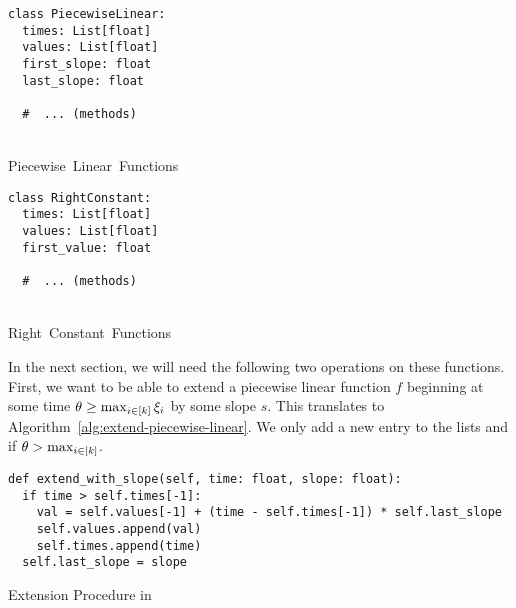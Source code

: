 \vspace{-1em}\hspace{-1em}\begin{minipage}[t]{0.5\textwidth}%
\begin{classdef}[H]%
    \begin{verbatim}
class PiecewiseLinear:
  times: List[float]
  values: List[float]
  first_slope: float
  last_slope: float

  #  ... (methods)
\end{verbatim}
    \caption{\\Piecewise~Linear~Functions\vphantom{Right}}%
    \label{data:piecewise-linear}
\end{classdef}%
\end{minipage}\begin{minipage}[t]{0.5\textwidth}%
\begin{classdef}[H]
    \begin{verbatim}
class RightConstant:
  times: List[float]
  values: List[float]
  first_value: float

  #  ... (methods)

\end{verbatim}
    \vspace{.084em}
    \caption{\\Right~Constant~Functions}%
    \label{data:right-constant}
\end{classdef}
\end{minipage}\vspace{1em}


In the next section, we will need the following two operations on these functions.
First, we want to be able to extend a piecewise linear function $f$ beginning at some time $\theta \geq \max_{i\in[k]} \xi_i$ by some slope $s$.
This translates to Algorithm~\ref{alg:extend-piecewise-linear}.
We only add a new entry to the lists  and  if $\theta > \max_{i\in[k]}$.

\begin{algorithm}
  \begin{verbatim}
def extend_with_slope(self, time: float, slope: float):
  if time > self.times[-1]:
    val = self.values[-1] + (time - self.times[-1]) * self.last_slope
    self.values.append(val)
    self.times.append(time)
  self.last_slope = slope
  \end{verbatim}
  \caption{Extension Procedure in }
  \label{alg:extend-piecewise-linear}
\end{algorithm}

